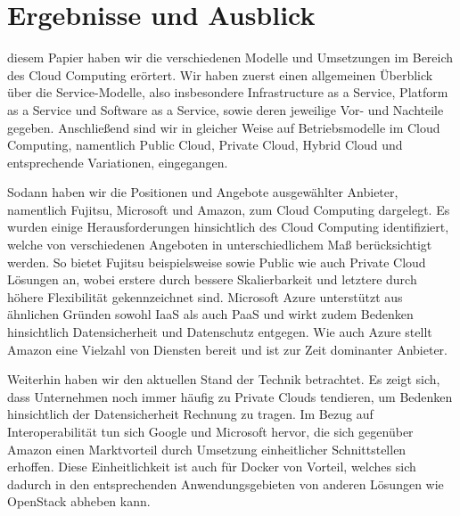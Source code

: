 \section{Ergebnisse und Ausblick}
\label{sec_conclusion}

 diesem Papier haben wir die verschiedenen Modelle und Umsetzungen im Bereich des Cloud Computing erörtert. 
Wir haben zuerst einen allgemeinen Überblick über die Service-Modelle, also insbesondere Infrastructure as a Service, Platform as a Service und Software as a Service, sowie deren jeweilige Vor- und Nachteile gegeben. 
Anschließend sind wir in gleicher Weise auf Betriebsmodelle im Cloud Computing, namentlich Public Cloud, Private Cloud, Hybrid Cloud und entsprechende Variationen, eingegangen. 


Sodann haben wir die Positionen und Angebote ausgewählter Anbieter, namentlich Fujitsu, Microsoft und Amazon, zum Cloud Computing dargelegt. 
Es wurden einige Herausforderungen hinsichtlich des Cloud Computing identifiziert, welche von verschiedenen Angeboten in unterschiedlichem Maß berücksichtigt werden. 
So bietet Fujitsu beispielsweise sowie Public wie auch Private Cloud Lösungen an, wobei erstere durch bessere Skalierbarkeit und letztere durch höhere Flexibilität gekennzeichnet sind. 
Microsoft Azure unterstützt aus ähnlichen Gründen sowohl IaaS als auch PaaS und wirkt zudem Bedenken hinsichtlich Datensicherheit und Datenschutz entgegen. 
Wie auch Azure stellt Amazon eine Vielzahl von Diensten bereit und ist zur Zeit dominanter Anbieter.


Weiterhin haben wir den aktuellen Stand der Technik betrachtet.
Es zeigt sich, dass Unternehmen noch immer häufig zu Private Clouds tendieren, um Bedenken hinsichtlich der Datensicherheit Rechnung zu tragen. 
Im Bezug auf Interoperabilität tun sich Google und Microsoft hervor, die sich gegenüber Amazon einen Marktvorteil durch Umsetzung einheitlicher Schnittstellen erhoffen. 
Diese Einheitlichkeit ist auch für Docker von Vorteil, welches sich dadurch in den entsprechenden Anwendungsgebieten von anderen Lösungen wie OpenStack abheben kann. 

